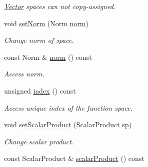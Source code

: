 \begin{DoxyCompactItemize}
\begin{DoxyCompactList}\small\item\em \hyperlink{classSpacy_1_1Vector}{\-Vector} spaces can not copy-\/assigned. \end{DoxyCompactList}\item 
\hypertarget{classSpacy_1_1VectorSpace_acbd69a540d3c81606751237a94783754}{void \hyperlink{classSpacy_1_1VectorSpace_acbd69a540d3c81606751237a94783754}{set\-Norm} (\-Norm \hyperlink{classSpacy_1_1VectorSpace_a2f26e33994544a37a83e6938a748ab8c}{norm})}\label{classSpacy_1_1VectorSpace_acbd69a540d3c81606751237a94783754}

\begin{DoxyCompactList}\small\item\em \-Change norm of space. \end{DoxyCompactList}\item 
\hypertarget{classSpacy_1_1VectorSpace_a2f26e33994544a37a83e6938a748ab8c}{const \-Norm \& \hyperlink{classSpacy_1_1VectorSpace_a2f26e33994544a37a83e6938a748ab8c}{norm} () const }\label{classSpacy_1_1VectorSpace_a2f26e33994544a37a83e6938a748ab8c}

\begin{DoxyCompactList}\small\item\em \-Access norm. \end{DoxyCompactList}\item 
\hypertarget{classSpacy_1_1VectorSpace_a4cc04c09af8d01608c2fe2e29028c26b}{unsigned \hyperlink{classSpacy_1_1VectorSpace_a4cc04c09af8d01608c2fe2e29028c26b}{index} () const }\label{classSpacy_1_1VectorSpace_a4cc04c09af8d01608c2fe2e29028c26b}

\begin{DoxyCompactList}\small\item\em \-Access unique index of the function space. \end{DoxyCompactList}\item 
\hypertarget{classSpacy_1_1VectorSpace_aea7bc0d44dbdabe49f0f74d42290fd23}{void \hyperlink{classSpacy_1_1VectorSpace_aea7bc0d44dbdabe49f0f74d42290fd23}{set\-Scalar\-Product} (\-Scalar\-Product sp)}\label{classSpacy_1_1VectorSpace_aea7bc0d44dbdabe49f0f74d42290fd23}

\begin{DoxyCompactList}\small\item\em \-Change scalar product. \end{DoxyCompactList}\item 
\hypertarget{classSpacy_1_1VectorSpace_a6f63e2ef5afe7530cbc9480cbc37a8d7}{const \-Scalar\-Product \& \hyperlink{classSpacy_1_1VectorSpace_a6f63e2ef5afe7530cbc9480cbc37a8d7}{scalar\-Product} () const }\label{classSpacy_1_1VectorSpace_a6f63e2ef5afe7530cbc9480cbc37a8d7}


\end{DoxyCompactItemize}
